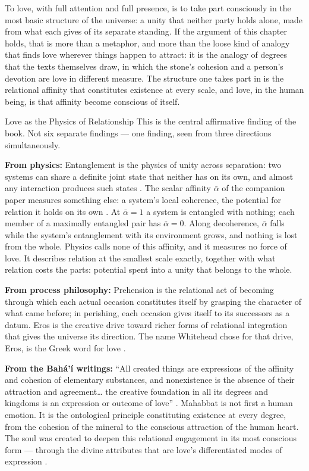 To love, with full attention and full presence, is to take part consciously in the most basic structure of the universe: a unity that neither party holds alone, made from what each gives of its separate standing. If the argument of this chapter holds, that is more than a metaphor, and more than the loose kind of analogy that finds love wherever things happen to attract: it is the analogy of degrees that the \bahai texts themselves draw, in which the stone's cohesion and a person's devotion are love in different measure. The structure one takes part in is the relational affinity that constitutes existence at every scale, and love, in the human being, is that affinity become conscious of itself.

\begin{convergencemoment}{Love as the Physics of Relationship}
This is the central affirmative finding of the book. Not six separate findings — one finding, seen from three directions simultaneously.

\textbf{From physics:} Entanglement is the physics of unity across separation: two systems can share a definite joint state that neither has on its own, and almost any interaction produces such states \citep{Bell1964, Aspect1982}. The scalar affinity $\bar{\alpha}$ of the companion paper measures something else: a system's local coherence, the potential for relation it holds on its own \citep{AdamsRCT}. At $\bar{\alpha} = 1$ a system is entangled with nothing; each member of a maximally entangled pair has $\bar{\alpha} = 0$. Along decoherence, $\bar{\alpha}$ falls while the system's entanglement with its environment grows, and nothing is lost from the whole. Physics calls none of this affinity, and it measures no force of love. It describes relation at the smallest scale exactly, together with what relation costs the parts: potential spent into a unity that belongs to the whole.

\textbf{From process philosophy:} Prehension is the relational act of becoming through which each actual occasion constitutes itself by grasping the character of what came before; in perishing, each occasion gives itself to its successors as a datum. Eros is the creative drive toward richer forms of relational integration that gives the universe its direction. The name Whitehead chose for that drive, Eros, is the Greek word for love \citep{Whitehead1929, Whitehead1933}.

\textbf{From the Bahá'í writings:} ``All created things are expressions of the affinity and cohesion of elementary substances, and nonexistence is the absence of their attraction and agreement\ldots{} the creative foundation in all its degrees and kingdoms is an expression or outcome of love'' \citep[Talk 48]{PUP}. Mahabbat is not first a human emotion. It is the ontological principle constituting existence at every degree, from the cohesion of the mineral to the conscious attraction of the human heart. The soul was created to deepen this relational engagement in its most conscious form — through the divine attributes that are love's differentiated modes of expression \citep{GleaningsBahaullah, HiddenWords, SelectionsAbdul}.


\end{convergencemoment}
